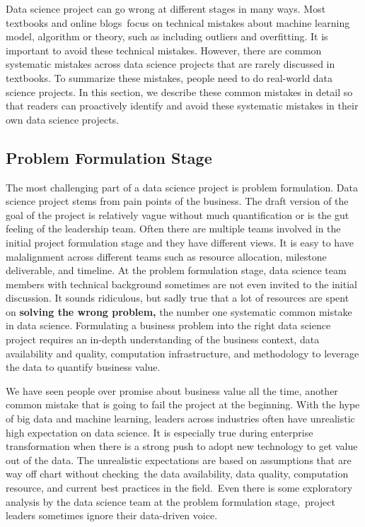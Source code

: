 \documentclass[12pt,]{krantz}
\begin{document}
Data science project can go wrong at different stages in many ways. Most textbooks and online blogs~focus on technical mistakes about machine learning model, algorithm or theory, such as including outliers and overfitting. It is important to avoid these technical mistakes. However, there are common systematic mistakes across data science projects that are rarely discussed in textbooks. To summarize these mistakes, people need to do real-world data science projects. In this section, we describe these common mistakes in detail so that readers can proactively identify and avoid these systematic mistakes in their own data science projects.

\hypertarget{problem-formulation-stage}{%
\subsection{Problem Formulation Stage}\label{problem-formulation-stage}}

The most challenging part of a data science project is problem formulation. Data science project stems from pain points of the business. The draft version of the goal of the project is relatively vague without much quantification or is the gut feeling of the leadership team. Often there are multiple teams involved in the initial project formulation stage and they have different views. It is easy to have malalignment across different teams such as resource allocation, milestone deliverable, and timeline. At the problem formulation stage, data science team members with technical background sometimes are not even invited to the initial discussion. It sounds ridiculous, but sadly true that a lot of resources are spent on \textbf{solving the wrong problem,} the number one systematic common mistake in data science. Formulating a business problem into the right data science project requires an in-depth understanding of the business context, data availability and quality, computation infrastructure, and methodology to leverage the data to quantify business value.

We have seen people over promise about business value all the time, another common mistake that is going to fail the project at the beginning. With the hype of big data and machine learning, leaders across industries often have unrealistic high expectation on data science. It is especially true during enterprise transformation when there is a strong push to adopt new technology to get value out of the data. The unrealistic expectations are based on assumptions that are way off chart without checking~the data availability, data quality, computation resource, and current best practices in the field.~Even there is some exploratory analysis by the data science team at the problem formulation stage,~project leaders sometimes ignore their data-driven voice.
\end{document}
